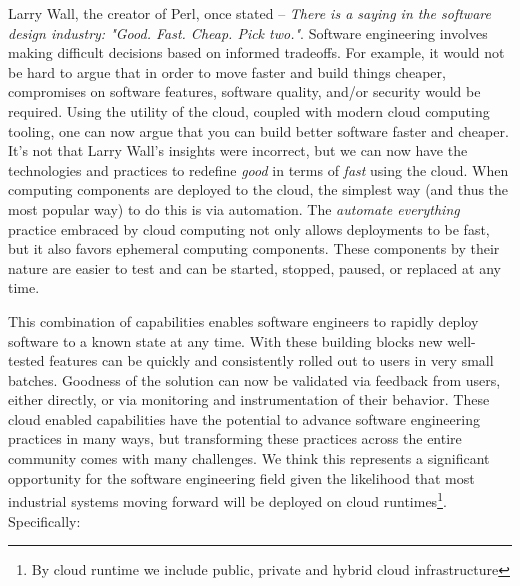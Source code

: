 \documentclass[conference]{IEEEtran}
\begin{document}
Larry Wall, the creator of Perl, once stated -- \textit{There is a saying in the software design industry: "Good. Fast. Cheap. Pick two."}.  Software engineering involves making difficult decisions based on informed tradeoffs.  For example, it would not be hard to argue that in order to move faster and build things cheaper, compromises on software features, software quality, and/or security would be required. Using the utility of the cloud, coupled with modern cloud computing tooling, one can now argue that you can build better software faster and cheaper.  It's not that Larry Wall's insights were incorrect, but we can now have the technologies and practices to redefine \textit{good} in terms of \textit{fast} using the cloud.  When computing components are deployed to the cloud, the simplest way (and thus the most popular way) to do this is via automation\cite{terraform, AWSCloudFormation, AzureLaunch, Pulumi}.  The \textit{automate everything} practice embraced by cloud computing not only allows deployments to be fast, but it also favors ephemeral computing components. These components by their nature are easier to test\cite{kim2016devops} and can be started, stopped, paused, or replaced at any time. 

This combination of capabilities enables software engineers to rapidly deploy software to a known state at any time. With these building blocks new well-tested features can be quickly and consistently rolled out to users in very small batches.  Goodness of the solution can now be validated via feedback from users, either directly, or via monitoring and instrumentation of their behavior.  These cloud enabled capabilities have the potential to advance software engineering practices in many ways, but transforming these practices across the entire community comes with many challenges. We think this represents a significant opportunity for the software engineering field given the likelihood that most industrial systems moving forward will be deployed on cloud runtimes\footnote{By cloud runtime we include public, private and hybrid cloud infrastructure}. Specifically:
\end{document}
